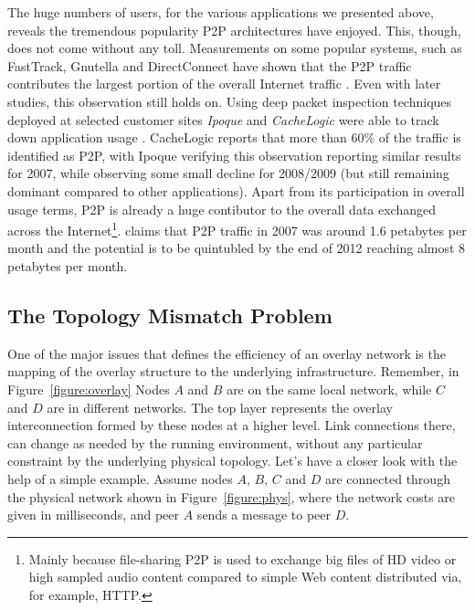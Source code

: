 \documentclass[acmcsur,acmnow]{acmtrans2m}
\begin{document}
The huge numbers of users, for the various applications we presented above, reveals the tremendous popularity P2P architectures have enjoyed. This, though, does not come without any toll. Measurements on some popular systems, such as FastTrack, Gnutella and DirectConnect have shown that the P2P traffic contributes the largest portion of the overall Internet traffic \cite{seroiu_analysiscds_2002, sen_analyzep2ptraffic_2004}. Even with later studies, this observation still holds on. Using deep packet inspection techniques deployed at selected customer sites \emph{Ipoque} and \emph{CacheLogic} were able to track down application usage \cite{cachelogic, ipoque2007, ipoque2009}. CacheLogic reports that more than 60\% of the traffic is identified as P2P, with Ipoque verifying this observation reporting similar results for 2007, while observing some small decline for 2008/2009 (but still remaining dominant compared to other applications). Apart from its participation in overall usage terms, P2P is already a huge contibutor to the overall data exchanged across the Internet\footnote{
    Mainly because file-sharing P2P is used to exchange big files of HD video or high sampled audio content compared to simple Web content distributed via, for example, HTTP.
}.
\cite{multinteligence} claims that P2P traffic in 2007 was around 1.6 petabytes per month and the potential is to be quintubled by the end of 2012 reaching almost 8 petabytes per month.

\subsection{The Topology Mismatch Problem}
One of the major issues that defines the efficiency of an overlay network is the mapping of the overlay structure to the underlying infrastructure. Remember, in Figure~\ref{figure:overlay} Nodes $A$ and $B$ are on the same local network, while $C$ and $D$ are in different networks. The top layer represents the overlay interconnection formed by these nodes at a higher level. Link connections there, can change as needed by the running environment, without any particular constraint by the underlying physical topology. Let's have a closer look with the help of a simple example. Assume nodes $A$, $B$, $C$ and $D$ are connected through the physical network shown in Figure~\ref{figure:phys}, where the network costs are given in milliseconds, and peer $A$ sends a message to peer $D$.
\end{document}
